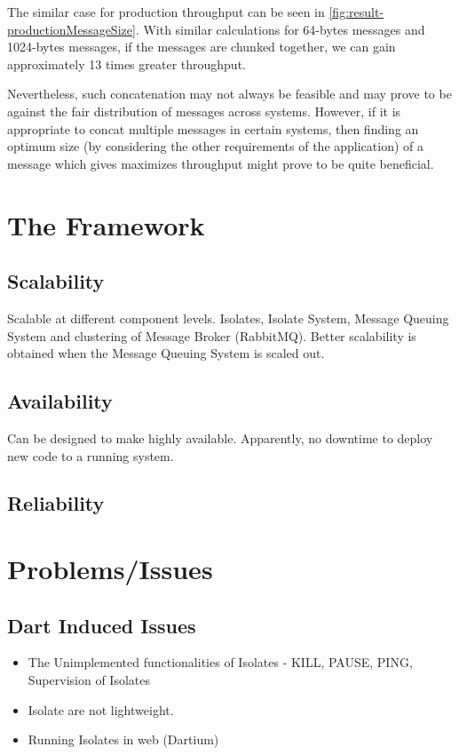   The similar case for production throughput can be seen in \autoref{fig:result-productionMessageSize}. With similar calculations for 64-bytes messages and 1024-bytes messages, if the messages are chunked together, we can gain approximately 13 times greater throughput.

  Nevertheless, such concatenation may not always be feasible and may prove to be against the fair distribution of messages across systems. However, if it is appropriate to concat multiple messages in certain systems, then finding an optimum size (by considering the other requirements of the application) of a message which gives maximizes throughput might prove to be quite beneficial.


\section{The Framework}

\subsection{Scalability}
    Scalable at different component levels. Isolates, Isolate System, Message Queuing System and clustering of Message Broker (RabbitMQ). Better scalability is obtained when the Message Queuing System is scaled out.

\subsection{Availability}
    Can be designed to make highly available. Apparently, no downtime to deploy new code to a running system.

  \subsection{Reliability}


\section{Problems/Issues}
\subsection{Dart Induced Issues}
  \begin{itemize}
  \item The Unimplemented functionalities of Isolates
    - KILL, PAUSE, PING, Supervision of Isolates
  \item Isolate are not lightweight.
  \item Running Isolates in web (Dartium)
\end{itemize}
